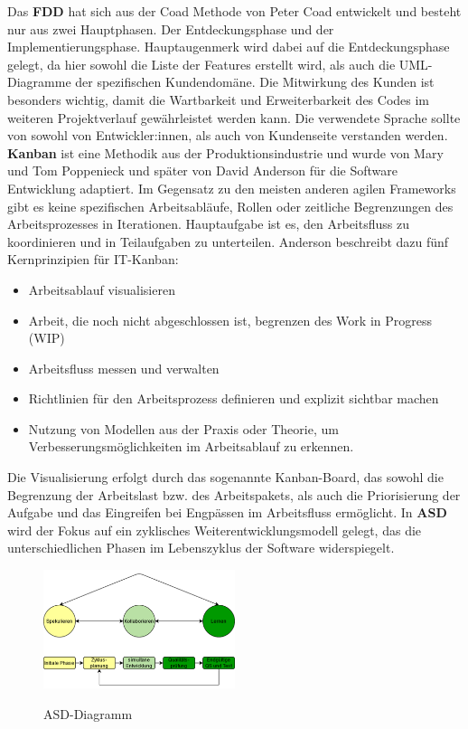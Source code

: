 \newline
Das \textbf{FDD} hat sich aus der Coad Methode von Peter Coad entwickelt und besteht nur aus zwei Hauptphasen. 
Der Entdeckungsphase und der Implementierungsphase. Hauptaugenmerk wird dabei auf die Entdeckungsphase gelegt, da hier sowohl die 
Liste der Features erstellt wird, als auch die UML-Diagramme der spezifischen Kundendomäne. 
Die Mitwirkung des Kunden ist besonders wichtig, damit die Wartbarkeit und Erweiterbarkeit des Codes im weiteren Projektverlauf gewährleistet werden kann. 
Die verwendete Sprache sollte von sowohl von Entwickler:innen, als auch von Kundenseite verstanden werden. \cite{Chowdhury2011-hg}
\newline
\textbf{Kanban} ist eine Methodik aus der Produktionsindustrie und wurde von Mary und Tom Poppenieck und später von David Anderson für 
die Software Entwicklung adaptiert. Im Gegensatz zu den meisten anderen agilen Frameworks gibt es keine spezifischen Arbeitsabläufe, 
Rollen oder zeitliche Begrenzungen des Arbeitsprozesses in Iterationen. 
Hauptaufgabe ist es, den Arbeitsfluss zu koordinieren und in Teilaufgaben zu unterteilen. Anderson beschreibt dazu fünf Kernprinzipien für IT-Kanban:
\begin{itemize}
    \item Arbeitsablauf visualisieren
    \item Arbeit, die noch nicht abgeschlossen ist, begrenzen des Work in Progress (WIP) 
    \item Arbeitsfluss messen und verwalten
    \item Richtlinien für den Arbeitsprozess definieren und explizit sichtbar machen
    \item Nutzung von Modellen aus der Praxis oder Theorie, um Verbesserungsmöglichkeiten im Arbeitsablauf zu erkennen.
\end{itemize}
Die Visualisierung erfolgt durch das sogenannte Kanban-Board, das sowohl die Begrenzung der Arbeitslast bzw. des Arbeitspakets, 
als auch die Priorisierung der Aufgabe und das Eingreifen bei Engpässen im Arbeitsfluss ermöglicht. \cite{Ahmad2018-jv,Granulo2019-wm}
\newline
In \textbf{ASD} wird der Fokus auf ein zyklisches Weiterentwicklungsmodell gelegt, das die unterschiedlichen Phasen im Lebenszyklus
der Software widerspiegelt. \cite{Abdelaziz2015-lb}
\begin{figure}[h!]
\centering
\caption{ASD-Diagramm}
    \includegraphics[width=0.5\textwidth]{fig/ASD.png}
    \label{fig:ASD-diagram}
\end{figure}
